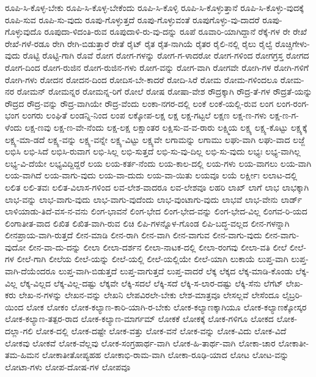 {ರೂಪಿ-ಸಿ-ಕೊಳ್ಳ-ಬೇಕು
ರೂಪಿ-ಸಿ-ಕೊಳ್ಳ-ಬೇಕೆಂದು
ರೂಪಿ-ಸಿ-ಕೊಳ್ಳಿ
ರೂಪಿ-ಸಿ-ಕೊಳ್ಳುತ್ತಾನೆ
ರೂಪಿ-ಸಿ-ಕೊಳ್ಳು-ವುದಕ್ಕೆ
ರೂಪಿ-ಸುವ
ರೂಪಿ-ಸು-ವುದು
ರೂಪು-ಗೊಳ್ಳುತ್ತದೆ
ರೂಪು-ಗೊಳ್ಳುವಂತೆ
ರೂಪುಗೊಳ್ಳು-ವು-ದಾದರೆ
ರೂಪು-ಗೊಳ್ಳುವುದೊ
ರೂಪುದಾ-ಳಿದಂತಿ-ರುವ
ರೂಪುದಾಳಿ-ರು-ವು-ದನ್ನು
ರೂಪೆ
ರೂವಾರಿ-ಯಾಗಿದ್ದಾನೆ
ರೆಕ್ಕೆ-ಗಳ
ರೇ
ರೇಖೆ
ರೇಖೆ-ಗಳೆ-ರಡೂ
ರೇಗಿ
ರೇಗಿ-ಬಿಡುತ್ತಾರೆ
ರೇತೆ
ರೈಟ್
ರೈತ
ರೈತ-ನಾಗಿಯೆ
ರೈತರ
ರೈಲಿ-ನಲ್ಲಿ
ರೈಲು
ರೈಲ್ವೆ
ರೊಚ್ಚಿಗೇಳು-ವುದು
ರೊಟ್ಟಿ
ರೊಟ್ಟಿ-ಗಾಗಿ
ರೊವೆ
ರೋಗ
ರೋಗ-ಗಳನ್ನು
ರೋಗ-ಗ-ಳಾದರೋ
ರೋಗ-ಗಳಿಂದ
ರೋಗಗ್ರಸ್ತ
ರೋಗದ
ರೋಗ-ದಿಂದ
ರೋಗ-ರುಜಿನ
ರೋಗ-ರುಜಿನ-ಗಳು
ರೋಗ-ವನ್ನು
ರೋಗ-ವಾಗಿ
ರೋಗವೇ
ರೋಗಿ-ಗಳ
ರೋಗಿ-ಗಳಿಗೆ
ರೋಗಿ-ಗಳು
ರೋದನ
ರೋದನ-ದಿಂದ
ರೋದಿಸ-ಬೇ-ಕಾದರೆ
ರೋದಿ-ಸಿರೆ
ರೋಮ
ರೋಮ-ಗಳಿಂದಲೂ
ರೋಮ-ನರ
ರೋಮನ್
ರೋಮನ್ನರ
ರೋಮನ್ನ-ರಿಗೆ
ರೋಲೆ
ರೋಷ
ರೋಷಾ-ವೇಶ
ರೌದ್ರಕ್ಕಾಗಿ
ರೌದ್ರ-ತೆ-ಗಳ
ರೌದ್ರತೆ-ಯನ್ನು
ರೌದ್ರದ
ರೌದ್ರ-ವನ್ನು
ರೌದ್ರ-ವಾಗಿಯೇ
ರೌದ್ರ-ವೆಂದು
ಲಂಕಾ-ನಗರ-ದಲ್ಲಿ
ಲಂಕೆ
ಲಂಕೆ-ಯಲ್ಲಿ-ರುವ
ಲಂಗ
ಲಂಗ-ರಂಗ-ಭಂಗ
ಲಂಗರು
ಲಂಘಿತೆ
ಲಂಡನ್ನಿ-ನಿಂದ
ಲಂಪ
ಲಕ್ಕೋಪ-ಲಕ್ಷ
ಲಕ್ಷ
ಲಕ್ಷ-ಗಟ್ಟಲೆ
ಲಕ್ಷಣ
ಲಕ್ಷ-ಣ-ಗಳು
ಲಕ್ಷ-ಣ-ಗ-ಳೆಂದು
ಲಕ್ಷ-ಣವು
ಲಕ್ಷ-ಣ-ವೇ-ನೆಂದು
ಲಕ್ಷ-ಲಕ್ಷ
ಲಕ್ಷಾಂತರ
ಲಕ್ಷಿಸು-ವ-ವ-ರಾರು
ಲಕ್ಷ್ಮಿಯ
ಲಕ್ಷ್ಯ
ಲಕ್ಷ್ಯ-ಕೊಟ್ಟು
ಲಕ್ಷ್ಯಕ್ಕೆ
ಲಕ್ಷ್ಯ-ಮಾ-ಡದೆ
ಲಕ್ಷ್ಯ-ವನ್ನು
ಲಕ್ಷ್ಯ-ವನ್ನೇ
ಲಕ್ಷ್ಯ-ವಿಟ್ಟು
ಲಕ್ಷ್ಯವೇ
ಲಗಾಮನ್ನು
ಲಗಾಮು
ಲಘು-ವಾಗಿ
ಲಘು-ವಾದ
ಲಜ್ಜೆ
ಲಭಿಸಿ
ಲಭಿ-ಸಿದೆ
ಲಭಿಸಿ-ರುವಾಗ
ಲಭಿ-ಸಿಲ್ಲ
ಲಭಿ-ಸುತ್ತದೆ
ಲಭಿ-ಸು-ವು-ದಿಲ್ಲ
ಲಭಿ-ಸು-ವುದು
ಲಭ್ಯಃ
ಲಭ್ಯ-ವಾಗಿಲ್ಲ
ಲಭ್ಯ-ವಿ-ದೆಯೇ
ಲಭ್ಯವಿದ್ದಿದ್ದರೆ
ಲಯ
ಲಯ-ಕರ್ತ-ನೆಂದು
ಲಯ-ಕಾಲ-ದಲ್ಲಿ
ಲಯ-ಗಳು
ಲಯ-ವಾಗಲು
ಲಯ-ವಾಗಿ
ಲಯ-ವಾಗಿದೆ
ಲಯ-ವಾಗು-ವುದು
ಲಯ-ವಾ-ದುದು
ಲಯ-ವಾ-ಯಿತು
ಲಯವೂ
ಲಯೆ
ಲರ್ಕ್ಷೀಃ
ಲಲಾಟ-ದಲ್ಲಿ
ಲಲಿತ
ಲಲಿ-ತವಃ
ಲಲಿತ-ವಿಲಾಸ-ಗಳಿಂದ
ಲವ-ಲೇಶ-ವಾದರೂ
ಲವ-ಲೇಶವೂ
ಲಹರಿ
ಲಾಖ್
ಲಾಗೆ
ಲಾಭ
ಲಾಭಕ್ಕಾಗಿ
ಲಾಭ-ವನ್ನು
ಲಾಭ-ವಾಗು-ವುದು
ಲಾಭ-ವಾಗು-ವುದೆಂದು
ಲಾಭ-ವುಂಟಾಗು-ವುದು
ಲಾಭವೆ
ಲಾಭ-ವೇನು
ಲಾರ್ಡ್
ಲಾಳಿಯಾಡು-ತಿದೆ-ವಸ-ನ-ವನು
ಲಿಂಗ-ಭಾವನೆ
ಲಿಂಗ-ಭೇದ
ಲಿಂಗ-ಭೇದ-ವನ್ನು
ಲಿಂಗ-ಭೇದ-ವಿಲ್ಲ
ಲಿಂಗವ-ರಿ-ಯದ
ಲಿಂಗಾತೀತ-ವಾದ
ಲಿಖಿತ
ಲಿಖಿತ-ವಾಗಿ-ರುವ
ಲಿಚಿ
ಲಿಪಿ-ಗಳನ್ನೊಳ-ಗೊಂಡ
ಲಿಪಿ-ಬದ್ಧ-ವಲ್ಲದ
ಲೀನ-ಗಳನ್ನಾಗಿ
ಲೀನಪ್ರಾಯ-ವಾಗಿ-ರುತ್ತದೆ
ಲೀನ-ಮಾಡಿ
ಲೀನ-ರಾಗಿ
ಲೀನ-ವಾಗಿ
ಲೀನ-ವಾಗುವ
ಲೀನ-ವಾಗು-ವುದು
ಲೀನ-ವಾಗು-ವುದೋ
ಲೀನ-ವಾ-ದು-ದನ್ನು
ಲೀಲಾ
ಲೀಲಾ-ದರ್ಶನ
ಲೀಲಾ-ನಾಟಕ-ದಲ್ಲಿ
ಲೀಲಾ-ರಂಗವು
ಲೀಲಾ-ವತಿ
ಲೀಲೆ
ಲೀಲೆ-ಗಳ
ಲೀಲೆ-ಗಾಗಿ
ಲೀಲೆಯ
ಲೀಲೆ-ಯನ್ನು
ಲೀಲೆ-ಯಲ್ಲಿ
ಲೀಲೆ-ಯಲ್ಲಿಯೇ
ಲೀಲೆ-ಯಾಗಿ
ಲುಕಾಯೆ
ಲುಪ್ತ-ವಾಗಿ
ಲುಪ್ತ-ವಾಗಿ-ದೆಯೆಂದರೂ
ಲುಪ್ತ-ವಾಗಿ-ಬಿಡುತ್ತದೆ
ಲುಪ್ತ-ವಾಗುತ್ತದೆ
ಲುಪ್ತ-ವಾದರೆ
ಲೆಕ್ಕ
ಲೆಕ್ಕದ
ಲೆಕ್ಕ-ಮಾಡಿ-ಕೊಂಡು
ಲೆಕ್ಕ-ವಿಲ್ಲ
ಲೆಕ್ಕ-ವಿಲ್ಲದ
ಲೆಕ್ಕ-ವಿಲ್ಲ-ದಷ್ಟು
ಲೆಕ್ಕವೇ
ಲೆಕ್ಕಿ-ಸದಲೆ
ಲೆಕ್ಕಿ-ಸದೆ
ಲೆಕ್ಕಿ-ಸ-ಲಾರ-ದಷ್ಟು
ಲೆಕ್ಕಿ-ಸೆನು
ಲೆಗೆಟ್
ಲೇಖ-ಕರು
ಲೇಖ-ನ-ಗಳನ್ನು
ಲೇಖನ-ವನ್ನು
ಲೇಖನಿ
ಲೇಪವಿರಲೇ-ಬೇಕು
ಲೇಶ-ಮಾತ್ರವೂ
ಲೇಸಲ್ಲವೆ
ಲೇಸೆಂದೂ
ಲೈಬ್ರರಿ-ಯಿಂದ
ಲೋಕ
ಲೋಕಂ
ಲೋಕ-ಕಲ್ಯಾಣ-ಕಾರಿ-ಯಾಗಿ-ರ-ಬೇಕು
ಲೋಕ-ಕಲ್ಯಾಣಕ್ಕಾಗಿಯೂ
ಲೋಕ-ಕಲ್ಯಾಣಕ್ಕೋಸ್ಕರ
ಲೋಕ-ಕಲ್ಯಾಣ-ತತ್ಪರ-ರಾದ
ಲೋಕ-ಕಲ್ಯಾಣ-ಮಾರ್ಗಮ್
ಲೋಕಕೆ
ಲೋಕಕ್ಕೆ
ಲೋಕ-ಗಳಿಗೂ
ಲೋಕದ
ಲೋಕ-ದಲ್ಲಾ-ಗಲಿ
ಲೋಕ-ದಲ್ಲಿ
ಲೋಕ-ದಷ್ಟೇ
ಲೋಕ-ವತ್ತು
ಲೋಕ-ವನೆ
ಲೋಕ-ವನ್ನು
ಲೋಕ-ವಿದು
ಲೋಕ-ವಿದೆ
ಲೋಕವು
ಲೋಕವೆ
ಲೋಕ-ವೆಲ್ಲವು
ಲೋಕ-ಸಂಗ್ರಹಾರ್ಥ-ವಾಗಿ
ಲೋಕ-ಹಿ-ತಾರ್ಥ-ವಾಗಿ
ಲೋಕಾ-ಚಾರ
ಲೋಕಾತೀ-ತಮ-ಹಿಮನ
ಲೋಕಾತೀತೋಪ್ಯಹಹ
ಲೋಕಾಭಿ-ರಾಮ-ವಾಗಿ
ಲೋಕಾ-ರೂಢಿ-ಯಾದ
ಲೋಟ
ಲೋಟ-ವನ್ನು
ಲೋಟಾ-ಗಳು
ಲೋಪ-ದೋಷ-ಗಳ
ಲೋಪವೂ
}
